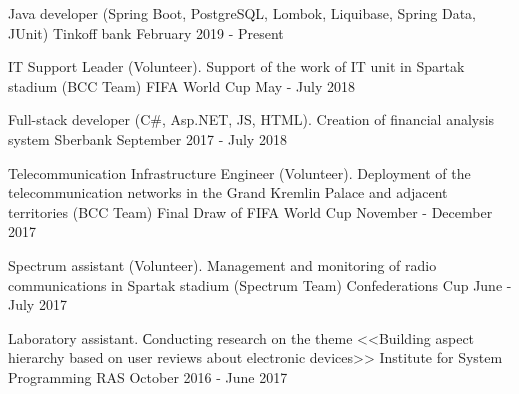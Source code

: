 

\vspace{0cm}\begin{cventries}
\cventry
{Java developer (Spring Boot, PostgreSQL, Lombok, Liquibase, Spring Data, JUnit)} %
{Tinkoff bank} %
{} %
{February 2019 - Present} %
\noindent	
	
\cventry
{IT Support Leader (Volunteer). Support of the work of IT unit in Spartak stadium (BCC Team)} %
{FIFA World Cup} %
{} %
{May - July 2018} %
\noindent	

\cventry
{Full-stack developer (C\#, Asp.NET, JS, HTML). Creation of financial analysis system} %
{Sberbank} %
{} %
{September 2017 - July 2018} %
\noindent	

\cventry
{Telecommunication Infrastructure Engineer (Volunteer). Deployment of the telecommunication networks in the Grand Kremlin Palace and adjacent territories (BCC Team)} %
{Final Draw of FIFA World Cup} %
{} %
{November - December 2017} %
\noindent	
	
\cventry
{Spectrum assistant (Volunteer). Management and monitoring of radio communications in Spartak stadium (Spectrum Team)} %
{Confederations Cup} %
{} %
{June - July 2017} %
\noindent	




\cventry
{Laboratory assistant. Сonducting research on the theme <<Building aspect hierarchy based on user reviews about electronic devices>>} %
{Institute for System Programming RAS} %
{} %
{October 2016 - June 2017} %
\noindent	



\end{cventries}